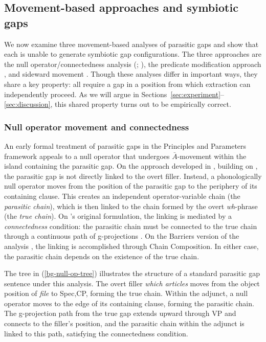 \documentclass[12pt]{article}
\begin{document}
\subsection{Movement-based approaches and symbiotic gaps}\label{sec:movement}

We now examine three movement-based analyses of parasitic gaps and show that each is unable to generate symbiotic gap configurations. The three approaches are the null operator/connectedness analysis (\citealt{kayne1983}; \citealt{chomsky1986}), the predicate modification approach \citep{nissenbaum2000}, and sideward movement \citep{nunes2004}. Though these analyses differ in important ways, they share a key property: all require a gap in a position from which extraction can independently proceed. As we will argue in Sections~\ref{sec:experiment}--\ref{sec:discussion}, this shared property turns out to be empirically correct.

\subsubsection{Null operator movement and connectedness}\label{sec:null-op}

An early formal treatment of parasitic gaps in the Principles and Parameters framework appeals to a null operator that undergoes $\bar{A}$-movement within the island containing the parasitic gap. On the approach developed in \citet{chomsky1986}, building on \citet{kayne1983}, the parasitic gap is not directly linked to the overt filler. Instead, a phonologically null operator moves from the position of the parasitic gap to the periphery of its containing clause. This creates an independent operator-variable chain (the \emph{parasitic chain}), which is then linked to the chain formed by the overt \emph{wh}-phrase (the \emph{true chain}). On \citeauthor{kayne1983}'s original formulation, the linking is mediated by a \emph{connectedness} condition: the parasitic chain must be connected to the true chain through a continuous path of g-projections \citep[strengthened with a proper government condition by][]{longobardi1985}. On the Barriers version of the analysis \citep{chomsky1986}, the linking is accomplished through Chain Composition. In either case, the parasitic chain depends on the existence of the true chain.

The tree in (\ref{bg-null-op-tree}) illustrates the structure of a standard parasitic gap sentence under this analysis. The overt filler \emph{which articles} moves from the object position of \emph{file} to Spec,CP, forming the true chain. Within the adjunct, a null operator moves to the edge of its containing clause, forming the parasitic chain. The g-projection path from the true gap extends upward through VP and connects to the filler's position, and the parasitic chain within the adjunct is linked to this path, satisfying the connectedness condition.
\end{document}

